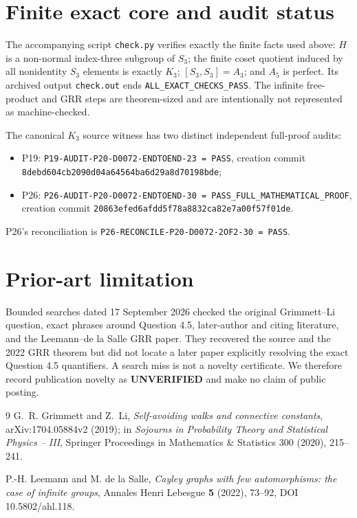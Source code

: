 \documentclass[11pt]{article}
\begin{document}
\section{Finite exact core and audit status}

The accompanying script \texttt{check.py} verifies exactly the finite facts used above: $H$ is a non-normal index-three subgroup of $S_3$; the finite coset quotient induced by all nonidentity $S_3$ elements is exactly $K_3$; $[S_3,S_3]=A_3$; and $A_5$ is perfect.  Its archived output \texttt{check.out} ends \texttt{ALL\_EXACT\_CHECKS\_PASS}.  The infinite free-product and GRR steps are theorem-sized and are intentionally not represented as machine-checked.

The canonical $K_3$ source witness has two distinct independent full-proof audits:
\begin{itemize}
\item P19: \texttt{P19-AUDIT-P20-D0072-ENDTOEND-23 = PASS}, creation commit \texttt{8debd604cb2090d04a64564ba6d29a8d70198bde};
\item P26: \texttt{P26-AUDIT-P20-D0072-ENDTOEND-30 = PASS\_FULL\_MATHEMATICAL\_PROOF}, creation commit \texttt{20863efed6afdd5f78a8832ca82e7a00f57f01de}.
\end{itemize}
P26's reconciliation is \texttt{P26-RECONCILE-P20-D0072-2OF2-30 = PASS}.

\section{Prior-art limitation}

Bounded searches dated 17 September 2026 checked the original Grimmett--Li question, exact phrases around Question 4.5, later-author and citing literature, and the Leemann--de la Salle GRR paper.  They recovered the source and the 2022 GRR theorem but did not locate a later paper explicitly resolving the exact Question 4.5 quantifiers.  A search miss is not a novelty certificate.  We therefore record publication novelty as \textbf{UNVERIFIED} and make no claim of public posting.

\begin{thebibliography}{9}
G.~R. Grimmett and Z.~Li,
\emph{Self-avoiding walks and connective constants},
arXiv:1704.05884v2 (2019); in \emph{Sojourns in Probability Theory and Statistical Physics -- III}, Springer Proceedings in Mathematics \& Statistics 300 (2020), 215--241.

P.-H. Leemann and M. de la Salle,
\emph{Cayley graphs with few automorphisms: the case of infinite groups},
Annales Henri Lebesgue \textbf{5} (2022), 73--92, DOI 10.5802/ahl.118.
\end{thebibliography}
\end{document}
